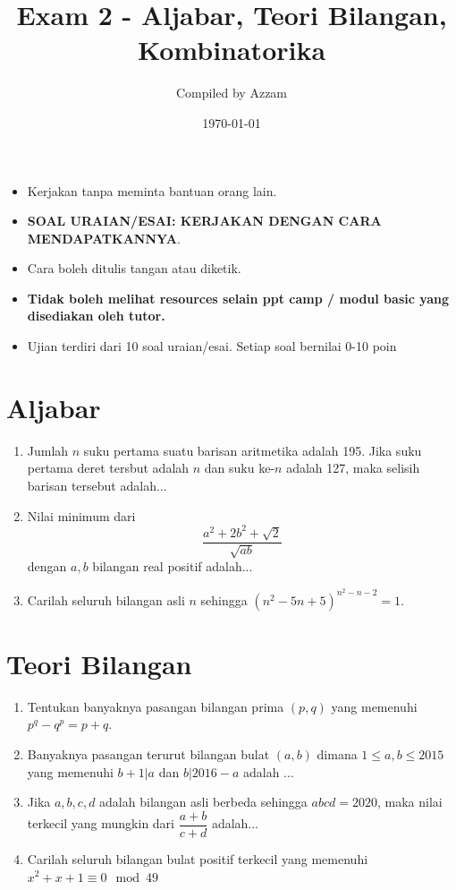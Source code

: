 \documentclass[12pt]{scrartcl}
\title{Exam 2 - Aljabar, Teori Bilangan, Kombinatorika} %
\date{\today}
\author{Compiled by Azzam}
\begin{document}
\maketitle

\renewcommand*\contentsname{Daftar Isi}
\tableofcontents

\newpage
\begin{remark*}
    \begin{itemize}
    \item Kerjakan tanpa meminta bantuan orang lain.
    \item \textbf{SOAL URAIAN/ESAI: KERJAKAN DENGAN CARA MENDAPATKANNYA}.
    \item Cara boleh ditulis tangan atau diketik. 
    \item \textbf{Tidak boleh melihat resources selain ppt camp / modul basic yang disediakan oleh tutor.}
    \item Ujian terdiri dari 10 soal uraian/esai. Setiap soal bernilai 0-10 poin
    \end{itemize}
\end{remark*}
\section{Aljabar}
\begin{enumerate}
      \item Jumlah $n$ suku pertama suatu barisan aritmetika adalah 195. Jika suku pertama deret tersbut adalah $n$ dan suku ke-$n$ adalah 127, maka selisih barisan tersebut adalah...

      \item Nilai minimum dari $$\frac{a^2+2b^2+\sqrt{2}}{\sqrt{ab}}$$ dengan $a,b$ bilangan real positif adalah...

      \item Carilah seluruh bilangan asli $n$ sehingga $(n^2-5n+5)^{n^2-n-2}=1$.
\end{enumerate}

\section{Teori Bilangan}
\begin{enumerate}[resume]
    \item Tentukan banyaknya pasangan bilangan prima $(p,q)$ yang memenuhi $p^q-q^p = p+q$.

    \item Banyaknya pasangan terurut bilangan bulat $(a, b)$ dimana $1 \le a, b \le 2015$ yang memenuhi $b + 1|a$ dan $b|2016 - a$ adalah ...

    \item Jika $a,b,c,d$ adalah bilangan asli berbeda sehingga $abcd=2020$, maka nilai terkecil yang mungkin dari $\dfrac{a+b}{c+d}$ adalah...

    \item Carilah seluruh bilangan bulat positif terkecil yang memenuhi $x^2+x+1 \equiv 0 \mod 49$
\end{enumerate}
\end{document}
